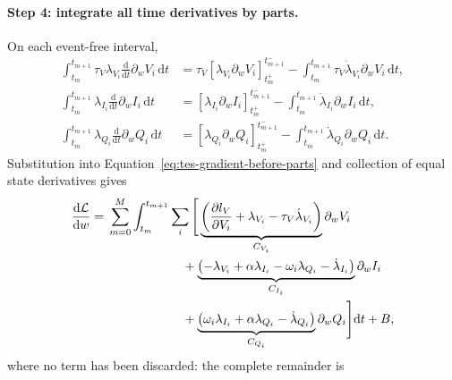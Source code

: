 \paragraph{Step 4: integrate all time derivatives by parts.}
On each event-free interval,
\begin{align}
    \int_{t_m}^{t_{m+1}}
      \tau_V\lambda_{V_i}
      \frac{\mathrm d}{\mathrm dt}\partial_w V_i\,\mathrm dt
      &=
      \tau_V\left[
        \lambda_{V_i}\partial_w V_i
      \right]_{t_m^+}^{t_{m+1}^-}
      -\int_{t_m}^{t_{m+1}}
        \tau_V\dot\lambda_{V_i}\partial_w V_i\,\mathrm dt,
        \label{eq:tes-parts-v}\\
    \int_{t_m}^{t_{m+1}}
      \lambda_{I_i}
      \frac{\mathrm d}{\mathrm dt}\partial_w I_i\,\mathrm dt
      &=
      \left[
        \lambda_{I_i}\partial_w I_i
      \right]_{t_m^+}^{t_{m+1}^-}
      -\int_{t_m}^{t_{m+1}}
        \dot\lambda_{I_i}\partial_w I_i\,\mathrm dt,
        \label{eq:tes-parts-i}\\
    \int_{t_m}^{t_{m+1}}
      \lambda_{Q_i}
      \frac{\mathrm d}{\mathrm dt}\partial_w Q_i\,\mathrm dt
      &=
      \left[
        \lambda_{Q_i}\partial_w Q_i
      \right]_{t_m^+}^{t_{m+1}^-}
      -\int_{t_m}^{t_{m+1}}
        \dot\lambda_{Q_i}\partial_w Q_i\,\mathrm dt.
        \label{eq:tes-parts-q}
\end{align}
Substitution into Equation~\eqref{eq:tes-gradient-before-parts} and collection
of equal state derivatives gives
\begin{align}
    \frac{\mathrm d\mathcal L}{\mathrm dw}
    ={}&\sum_{m=0}^{M}\int_{t_m}^{t_{m+1}}\sum_i
      \Bigg[
      \underbrace{\left(
        \frac{\partial l_V}{\partial V_i}
        +\lambda_{V_i}-\tau_V\dot\lambda_{V_i}
      \right)}_{C_{V_i}}\partial_w V_i
      \nonumber\\
    &\hspace{21mm}
      +\underbrace{\left(
        -\lambda_{V_i}+\alpha\lambda_{I_i}
        -\omega_i\lambda_{Q_i}-\dot\lambda_{I_i}
      \right)}_{C_{I_i}}\partial_w I_i
      \nonumber\\
    &\hspace{21mm}
      +\underbrace{\left(
        \omega_i\lambda_{I_i}
        +\alpha\lambda_{Q_i}-\dot\lambda_{Q_i}
      \right)}_{C_{Q_i}}\partial_w Q_i
      \Bigg]\mathrm dt
      +B,
    \label{eq:tes-gradient-collected}
\end{align}
where no term has been discarded: the complete remainder is
